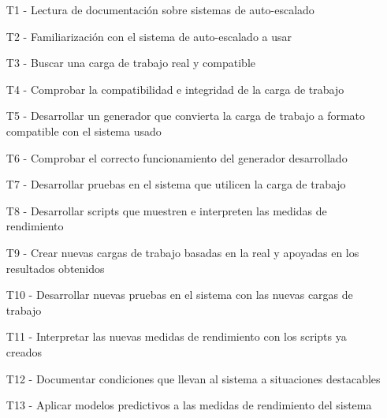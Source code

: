 \begin{enumerate}
    \item[T1 -] Lectura de documentación sobre sistemas de auto-escalado
    \item[T2 -] Familiarización con el sistema de auto-escalado a usar
    \item[T3 -] Buscar una carga de trabajo real y compatible
    \item[T4 -] Comprobar la compatibilidad e integridad de la carga de trabajo
    \item[T5 -] Desarrollar un generador que convierta la carga de trabajo a formato compatible con el sistema usado
    \item[T6 -] Comprobar el correcto funcionamiento del generador desarrollado
    \item[T7 -] Desarrollar pruebas en el sistema que utilicen la carga de trabajo
    \item[T8 -] Desarrollar scripts que muestren e interpreten las medidas de rendimiento
    \item[T9 -] Crear nuevas cargas de trabajo basadas en la real y apoyadas en los resultados obtenidos
    \item[T10 -] Desarrollar nuevas pruebas en el sistema con las nuevas cargas de trabajo
    \item[T11 -] Interpretar las nuevas medidas de rendimiento con los scripts ya creados
    \item[T12 -] Documentar condiciones que llevan al sistema a situaciones destacables
    \item[T13 -] Aplicar modelos predictivos a las medidas de rendimiento del sistema
\end{enumerate}


\begin{landscape}

\end{landscape}


{}
